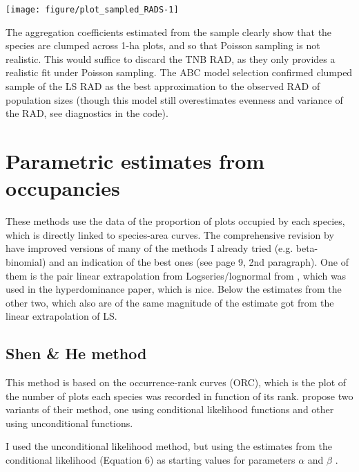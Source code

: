 \documentclass[12pt, A4]{article}\usepackage[]{graphicx}\usepackage[]{color}
\newenvironment{knitrout}{}{} %
\begin{document}
\begin{knitrout}
\color{fgcolor}

{\centering \texttt{[image: figure/plot\_sampled\_RADS-1]} 

}



\end{knitrout}

The aggregation coefficients estimated from the sample clearly show that
the species are clumped across 1-ha plots, and so that
Poisson sampling is not realistic. This would suffice to
discard the TNB RAD, as they only provides a realistic fit under Poisson sampling.
The ABC model selection confirmed clumped sample of the LS RAD as the
best approximation to the observed RAD of population sizes 
(though this model still overestimates evenness and variance of the RAD, see
diagnostics in the code).


\section{Parametric estimates from occupancies}

These methods use the data of the proportion of plots occupied by each species, which is directly linked to species-area curves.
The comprehensive revision by \citet{kunin2018} have improved versions of 
many of the methods I already tried 
(e.g. beta-binomial) and an indication of the best ones (see page 9, 2nd paragraph). 
One of them is  the pair linear extrapolation from Logseries/lognormal from \citet{ulrich2005}, which was used 
in the hyperdominance paper, which is nice. 
Below the estimates from the other two, which also are
of the same magnitude of the estimate got from the linear extrapolation of LS.


\subsection*{Shen \& He method}
\label{sec:shen--he}

This method is based on the occurrence-rank curves (ORC), which is the plot
of the number of plots each species was recorded in function of its rank.
\citet{shen2008} propose two variants of their method, one using
conditional likelihood functions and other using unconditional functions.

I used the unconditional likelihood method,
but using the estimates from the conditional
likelihood (Equation 6) as starting values for parameters
$\alpha$ and $\beta$ .
\end{document}
